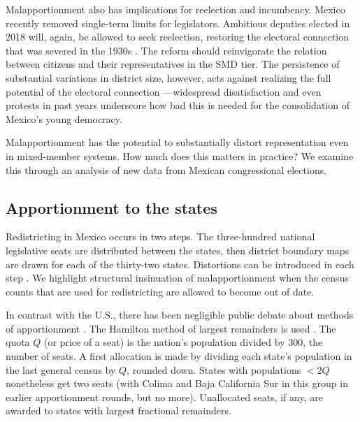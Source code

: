 \documentclass[letter,12pt]{article}
\begin{document}
Malapportionment also has implications for reelection and incumbency. Mexico recently removed single-term limits for legislators. Ambitious deputies elected in 2018 will, again, be allowed to seek reelection, restoring the electoral connection that was severed in the 1930s \citep{dworak.legisladorAexamen.2003}. The reform should reinvigorate the relation between citizens and their representatives in the SMD tier. The persistence of substantial variations in district size, however, acts against realizing the full potential of the electoral connection \citep{mayhew.1974}---widespread disatisfaction and even protests in past years underscore how bad this is needed for the consolidation of Mexico's young democracy. 


Malapportionment has the potential to substantially distort representation even in mixed-member systems. How much does this matters in practice? We examine this through an analysis of new data from Mexican congressional elections. 

\subsection{Apportionment to the states}

Redistricting in Mexico occurs in two steps. The three-hundred national legislative seats are distributed between the states, then district boundary maps are drawn for each of the thirty-two states. Distortions can be introduced in each step \citep[see][]{snyder.samuelsMalapp2004}. We highlight structural insinuation of malapportionment when the census counts that are used for redistricting are allowed to become out of date.


In contrast with the U.S., there has been negligible public debate about methods of apportionment \citep{szpiro.numbersRule.2010,balinski.rodriguez.1996}. The Hamilton method of largest remainders is used \citep[][:10]{balinskiYoung2001FairRep}. The quota $Q$ (or price of a seat) is the nation's population divided by 300, the number of seats. A first allocation is made by dividing each state's population in the last general census by $Q$, rounded down. States with populations $<2Q$ nonetheless get two seats (with Colima and Baja California Sur in this group in earlier apportionment rounds, but no more). Unallocated seats, if any, are awarded to states with largest fractional remainders. 
\end{document}
